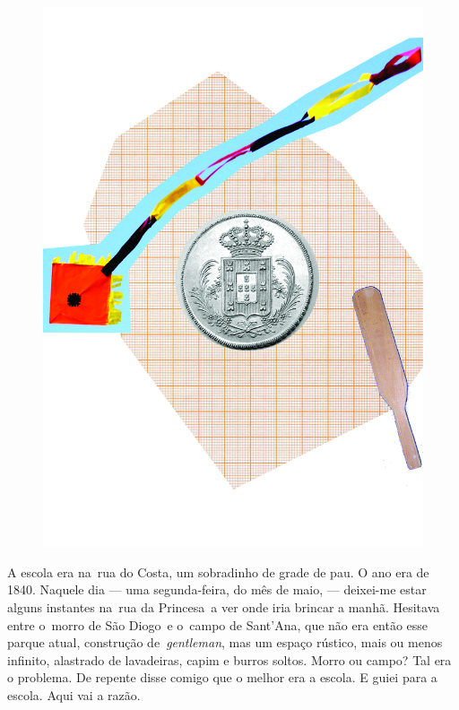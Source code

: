 \pagebreak
\thispagestyle{empty}
\begin{figure}
\includegraphics[width=\textwidth]{./ilustracoes/02_ESCOLA.jpg}
\end{figure}
\pagebreak


\noindent{}A escola era na~rua do Costa, um sobradinho de grade de pau. O ano era
de 1840. Naquele dia --- uma segunda-feira, do mês de maio, ---
deixei-me estar alguns instantes na~rua da Princesa~a ver onde iria
brincar a manhã. Hesitava entre o~morro de São Diogo~e o~campo de
Sant'Ana, que não era então esse parque atual, construção
de~\emph{gentleman}, mas um espaço rústico, mais ou menos infinito,
alastrado de lavadeiras, capim e burros soltos. Morro ou campo? Tal era
o problema. De repente disse comigo que o melhor era a escola. E guiei
para a escola. Aqui vai a razão.

